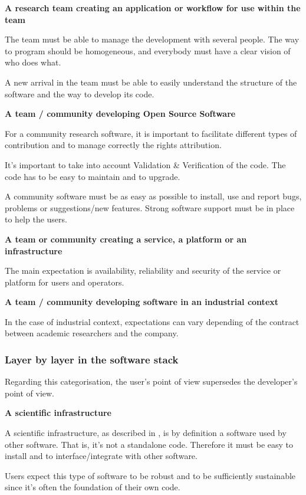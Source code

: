 \textbf{A research team creating an application or workflow for use within the team}

The team must be able to manage the development with several people. The way to program should be homogeneous, and everybody must have a clear vision of who does what.

A new arrival in the team must be able to easily understand the structure of the software and the way to develop its code.

\textbf{A team / community developing Open Source Software}

For a community research software, it is important to facilitate different types of contribution and to manage correctly the rights attribution.

It's important to take into account Validation \& Verification of the code. The code has to be easy to maintain and to upgrade.

A community software must be as easy as possible to install, use and report bugs, problems or suggestions/new features. Strong software support must be in place to help the users.

\textbf{A team or community creating a service, a platform or an infrastructure}

The main expectation is availability, reliability and security of the service or platform for users and operators.

\textbf{A team / community developing software in an industrial context}

In the case of industrial context, expectations can vary depending of the contract between academic researchers and the company.

\subsubsection{Layer by layer in the software stack}

Regarding this categorisation, the user's point of view supersedes the developer's point of view.

\textbf{A scientific infrastructure}

A scientific infrastructure, as described in \cite{hinsen2019}, is by definition a software used by other software. That is, it's not a standalone code. Therefore it must be easy to install and to interface/integrate with other software.

Users expect this type of software to be robust and to be sufficiently sustainable since it's often the foundation of their own code.

